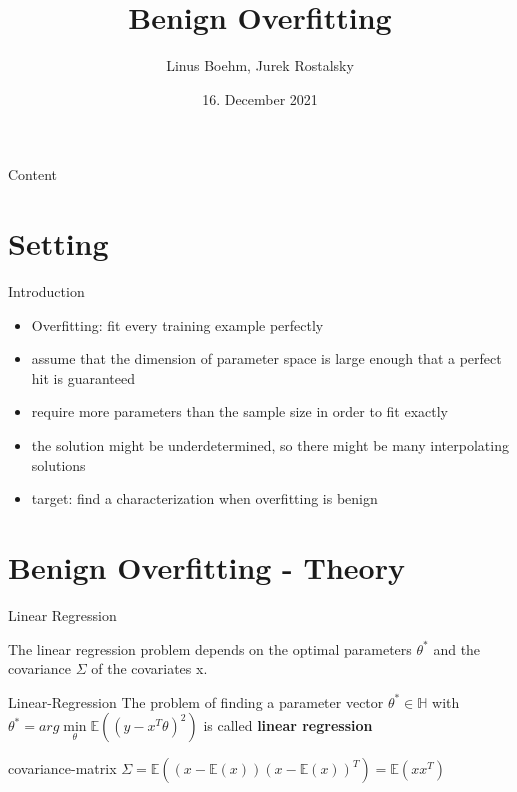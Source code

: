 \documentclass{beamer}
\title{Benign Overfitting}
\date{16. December 2021}
\author{Linus Boehm, Jurek Rostalsky}
\begin{document}
\maketitle

\begin{frame}{Content}
\tableofcontents
\end{frame}

\section{Setting}

\begin{frame}{Introduction}
\begin{itemize}
	\item Overfitting: fit every training example perfectly
	\item assume that the dimension of parameter space is large enough that a perfect hit is guaranteed 
	\item require more parameters than the sample size in order to fit exactly
	\item the solution might be underdetermined, so there might be many interpolating solutions
	\item target: find a characterization when overfitting is benign
\end{itemize}
\end{frame}

\section{Benign Overfitting - Theory}

\begin{frame}{Linear Regression}
	
The linear regression problem depends on the optimal parameters $\theta^*$ and the covariance $\Sigma$ of the covariates x.

\begin{center}
\begin{block}{Linear-Regression}
The problem of finding a parameter vector \(\theta^\ast \in \mathbb{H}\) with 
$\theta^\ast = arg \min\limits_\theta \mathbb{E}\left((y - x^T \theta)^2\right)$
is called \textbf{linear regression}
\end{block}
\begin{block}{covariance-matrix}
$\Sigma = \mathbb{E}\left(\left(x - \mathbb{E}(x)\right)\left(x - \mathbb{E}(x)\right)^T\right) =  \mathbb{E}(xx^T)$
\end{block}
\end{center}
\end{frame}
\end{document}
